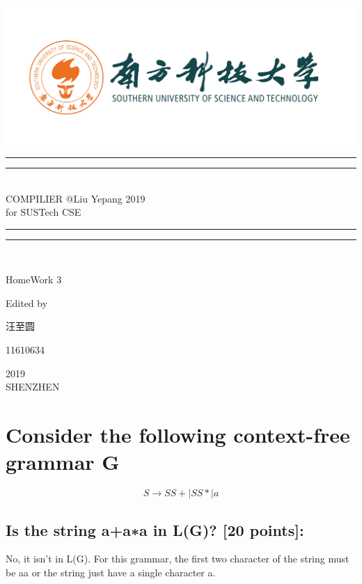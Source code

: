 \documentclass{article}
\begin{document}
 
    \begin{titlepage}       %
        \centering
        \includegraphics[width=\textwidth]{../SUSTC_LOGO.png}
        \rule{\textwidth}{1.6pt}\vspace*{-\baselineskip}\vspace*{2pt}
        \rule{\textwidth}{0.4pt}\\[\baselineskip]
        {\LARGE COMPILIER @Liu Yepang 2019\\[\baselineskip]\small for SUSTech CSE}
        \\[0.2\baselineskip]
        \rule{\textwidth}{0.4pt}\vspace*{-\baselineskip}\vspace{3.2pt}
        \rule{\textwidth}{1.6pt}\\[\baselineskip]
        \scshape
        \vspace*{\baselineskip}
        {\Large HomeWork 3\par }
        Edited by \\[\baselineskip] {汪至圆\par}
        {\Large 11610634\par }
        \vfill
        {\scshape 2019} \\{\large SHENZHEN}\par
    \end{titlepage}
    \section{Consider the following context-free grammar G}
        $$S \rightarrow S S+|S S *| a$$
        \subsection{Is the string a+a∗a in L(G)? [20 points]:}
            No, it isn't in L(G). For this grammar, the first two character of the string
            must be aa or the string just have a single character a.
\end{document}
